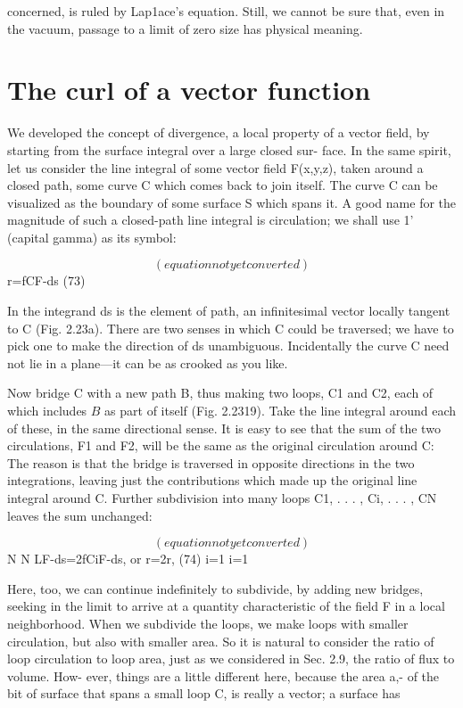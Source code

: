  

concerned, is ruled by Lap1ace's equation. Still, we cannot be sure
that, even in the vacuum, passage to a limit of zero size has physical
meaning.

\section{The curl of a vector function}

We developed the concept of divergence, a local property of a vector
field, by starting from the surface integral over a large closed sur-
face. In the same spirit, let us consider the line integral of some vector
field F(x,y,z), taken around a closed path, some curve C which
comes back to join itself. The curve C can be visualized as the
boundary of some surface S which spans it. A good name for the
magnitude of such a closed-path line integral is circulation; we shall
use 1' (capital gamma) as its symbol:

\begin{equation}
(equation not yet converted)
\end{equation}
r=fCF-ds (73)

In the integrand ds is the element of path, an infinitesimal vector
locally tangent to C (Fig. 2.23a). There are two senses in which C
could be traversed; we have to pick one to make the direction of ds
unambiguous. Incidentally the curve C need not lie in a plane---it
can be as crooked as you like.

Now bridge C with a new path B, thus making two loops, C1 and
C2, each of which includes $B$ as part of itself (Fig. 2.2319). Take the
line integral around each of these, in the same directional sense. It
is easy to see that the sum of the two circulations, F1 and F2, will be
the same as the original circulation around C: The reason is that the
bridge is traversed in opposite directions in the two integrations,
leaving just the contributions which made up the original line integral
around C. Further subdivision into many loops C1, . . . , Ci, . . . , CN
leaves the sum unchanged:

\begin{equation}
(equation not yet converted)
\end{equation}
N N
LF-ds=2fCiF-ds, or r=2r, (74)
i=1 i=1

Here, too, we can continue indefinitely to subdivide, by adding
new bridges, seeking in the limit to arrive at a quantity characteristic
of the field F in a local neighborhood. When we subdivide the loops,
we make loops with smaller circulation, but also with smaller area.
So it is natural to consider the ratio of loop circulation to loop area,
just as we considered in Sec. 2.9, the ratio of flux to volume. How-
ever, things are a little different here, because the area a,- of the bit
of surface that spans a small loop C, is really a vector; a surface has

